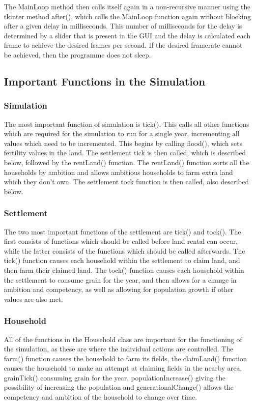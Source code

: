 \documentclass[12pt]{article}
\begin{document}
			The MainLoop method then calls itself again in a non-recursive manner using the tkinter method after(), which calls the MainLoop function again without blocking after a given delay in milliseconds. This number of milliseconds for the delay is determined by a slider that is present in the GUI and the delay is calculated each frame to achieve the desired frames per second. If the desired framerate cannot be achieved, then the programme does not sleep.
		
		\subsection{Important Functions in the Simulation}
			\subsubsection{Simulation}
				The most important function of simulation is tick(). This calls all other functions which are required for the simulation to run for a single year, incrementing all values which need to be incremented. This begins by calling flood(), which sets fertility values in the land. The settlement tick is then called, which is described below, followed by the rentLand() function. The rentLand() function sorts all the households by ambition and allows ambitious households to farm extra land which they don't own. The settlement tock function is then called, also described below.
				
			\subsubsection{Settlement}
				The two most important functions of the settlement are tick() and tock(). The first consists of functions which should be called before land rental can occur, while the latter consists of the functions which should be called afterwards. The tick() function causes each household within the settlement to claim land, and then farm their claimed land. The tock() function causes each household within the settlement to consume grain for the year, and then allows for a change in ambition and competency, as well as allowing for population growth if other values are also met.\\
				
			\subsubsection{Household}
				All of the functions in the Household class are important for the functioning of the simulation, as these are where the individual actions are controlled. The farm() function causes the household to farm its fields, the claimLand() function causes the household to make an attempt at claiming fields in the nearby area, grainTick() consuming grain for the year, populationIncrease() giving the possibility of increasing the population and generationalChange() allows the competency and ambition of the household to change over time.
			
\end{document}
